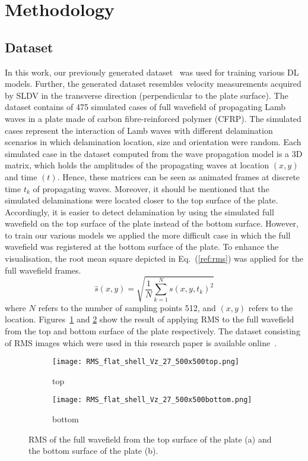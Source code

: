 \section{Methodology}
\label{methodology}
\subsection{Dataset}
In this work, our previously generated dataset~\cite{Ijjeh2021} was used for training various DL models.
Further, the generated dataset resembles velocity measurements acquired by SLDV in the transverse direction (perpendicular to the plate surface).
The dataset contains of 475 simulated cases of full wavefield of propagating Lamb waves in a plate made of carbon fibre-reinforced polymer (CFRP).
The simulated cases represent the interaction of Lamb waves with different delamination scenarios in which delamination location, size and orientation were random.
Each simulated case in the dataset computed from the wave propagation model is a 3D matrix, which holds the amplitudes of the propagating waves at location \((x,y)\) and time \((t)\).
Hence, these matrices can be seen as animated frames at discrete time \(t_k\) of propagating waves.
Moreover, it should be mentioned that the simulated delaminations were located closer to the top surface of the plate.
Accordingly, it is easier to detect delamination by using the simulated full wavefield on the top surface of the plate instead of the bottom surface.
However, to train our various models we applied the more difficult case in which the full wavefield was registered at the bottom surface of the plate.
To enhance the visualisation, the root mean square depicted in Eq.~(\ref{ref:rms}) was applied for the full wavefield frames.
\begin{equation}
	\hat{s}(x,y) = \sqrt{\frac{1}{N}\sum_{k=1}^{N} s(x,y,t_k)^2}
	\label{ref:rms}
\end{equation}
where \(N\) refers to the number of sampling points 512,  and \((x,y)\) refers to the location.
Figures~\ref{fig:rmstop} and \ref{fig:rmsbottom} show the result of applying RMS to the full wavefield from the top and bottom surface of the plate respectively.
The dataset consisting of RMS images which were used in this research paper is available online~\cite{Kudela2020d}.
\begin{figure} [h!]
	\centering
	\begin{subfigure}[b]{0.47\textwidth}
		\centering
		\texttt{[image: RMS\_flat\_shell\_Vz\_27\_500x500top.png]}
		\caption{top}
		\label{fig:rmstop}
	\end{subfigure}
	\hfill
	\begin{subfigure}[b]{0.47\textwidth}
		\centering
		\texttt{[image: RMS\_flat\_shell\_Vz\_27\_500x500bottom.png]}
		\caption{bottom}
		\label{fig:rmsbottom}
	\end{subfigure}
	\caption{RMS of the full wavefield from the top surface of the plate (a) and the bottom surface of the plate (b).}
\label{fig:rms}
\end{figure} 
